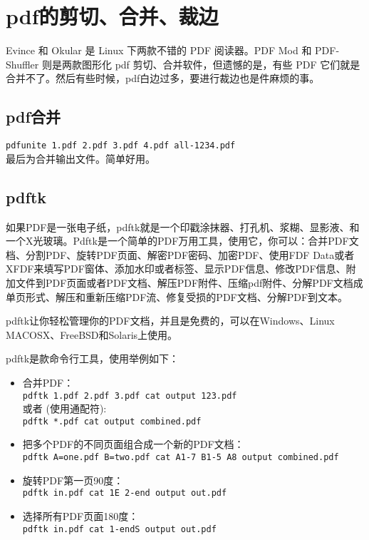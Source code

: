 {\section{pdf的剪切、合并、裁边}
Evince 和 Okular 是 Linux 下两款不错的 PDF 阅读器。PDF Mod 和 PDF-Shuffler 则是两款图形化 pdf 剪切、合并软件，但遗憾的是，有些 PDF 它们就是合并不了。然后有些时候，pdf白边过多，要进行裁边也是件麻烦的事。

\subsection{pdf合并}
\verb|pdfunite 1.pdf 2.pdf 3.pdf 4.pdf all-1234.pdf|\\
最后为合并输出文件。简单好用。

\subsection{pdftk}
如果PDF是一张电子纸，pdftk就是一个印戳涂抹器、打孔机、浆糊、显影液、和一个X光玻璃。Pdftk是一个简单的PDF万用工具，使用它，你可以：合并PDF文档、分割PDF、旋转PDF页面、解密PDF密码、加密PDF、使用FDF Data或者XFDF来填写PDF窗体、添加水印或者标签、显示PDF信息、修改PDF信息、附加文件到PDF页面或者PDF文档、解压PDF附件、压缩pdf附件、分解PDF文档成单页形式、解压和重新压缩PDF流、修复受损的PDF文档、分解PDF到文本。

pdftk让你轻松管理你的PDF文档，并且是免费的，可以在Windows、Linux MACOSX、FreeBSD和Solaris上使用。

pdftk是款命令行工具，使用举例如下：
\begin{itemize}
\item 合并PDF：\\
\verb|pdftk 1.pdf 2.pdf 3.pdf cat output 123.pdf|\\
或者 (使用通配符):\\
\verb|pdftk *.pdf cat output combined.pdf|

\item 把多个PDF的不同页面组合成一个新的PDF文档：\\
\verb|pdftk A=one.pdf B=two.pdf cat A1-7 B1-5 A8 output combined.pdf|

\item 旋转PDF第一页90度：\\
\verb|pdftk in.pdf cat 1E 2-end output out.pdf|

\item 选择所有PDF页面180度：\\
\verb|pdftk in.pdf cat 1-endS output out.pdf|


\end{itemize}}
